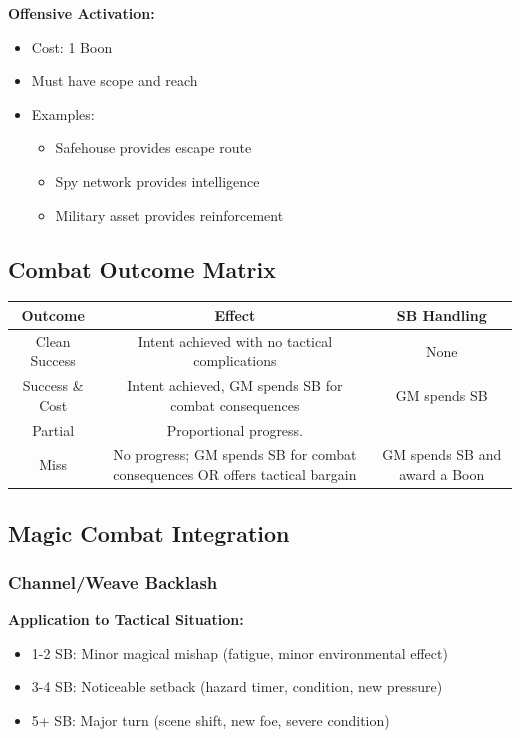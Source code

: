 \documentclass[11pt,letterpaper]{article}
\begin{document}
\textbf{Offensive Activation:}
\begin{itemize}[leftmargin=*]
    \item Cost: 1 Boon
    \item Must have scope and reach
    \item Examples:
    \begin{itemize}
        \item Safehouse provides escape route
        \item Spy network provides intelligence
        \item Military asset provides reinforcement
    \end{itemize}
\end{itemize}

\subsection{Combat Outcome Matrix}

\begin{center}
\begin{tabular}{|c|c|c|}
\hline
\textbf{Outcome} & \textbf{Effect} & \textbf{SB Handling} \\
\hline
Clean Success & Intent achieved with no tactical complications & None \\
\hline
Success \& Cost & Intent achieved, GM spends SB for combat consequences & GM spends SB \\
\hline
Partial & Proportional progress.  \\
\hline
Miss & No progress; GM spends SB for combat consequences OR offers tactical bargain & GM spends SB and award a Boon \\
\hline
\end{tabular}
\end{center}

\subsection{Magic Combat Integration}

\subsubsection{Channel/Weave Backlash}

\textbf{Application to Tactical Situation:}
\begin{itemize}[leftmargin=*]
    \item 1-2 SB: Minor magical mishap (fatigue, minor environmental effect)
    \item 3-4 SB: Noticeable setback (hazard timer, condition, new pressure)
    \item 5+ SB: Major turn (scene shift, new foe, severe condition)
\end{itemize}
\end{document}
